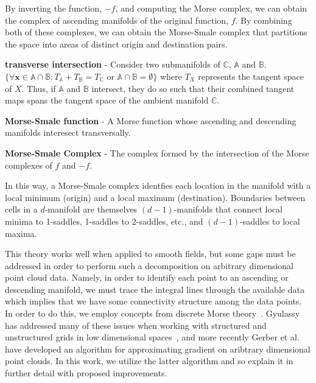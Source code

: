 By inverting the function, $-f$, and computing the Morse complex, we can obtain the complex of ascending manifolds of the original function, $f$.
%
By combining both of these complexes, we can obtain the Morse-Smale complex that partitions the space into areas of distinct origin and destination pairs.


\begin{defn}
\textbf{transverse intersection} - Consider two submanifolds of $\mathbb{C}$, $\mathbb{A}$ and $\mathbb{B}$. $\{\forall \mathbf{x} \in \mathbb{A} \cap \mathbb{B}: T_{\mathbb{A}} + T_{\mathbb{B}} = T_{\mathbb{C}} \text{ or } \mathbb{A} \cap \mathbb{B} = \emptyset\}$ where $T_{X}$ represents the tangent space of $X$.
%
Thus, if $\mathbb{A}$ and $\mathbb{B}$ intersect, they do so such that their combined tangent maps spans the tangent space of the ambient manifold $\mathbb{C}$.
\end{defn}

\begin{defn}
\textbf{Morse-Smale function} - A Morse function whose ascending and descending manifolds interesect transversally.
\end{defn}

\begin{defn}
\textbf{Morse-Smale Complex} - The complex formed by the intersection of the Morse complexes of $f$ and $-f$.
\end{defn}

In this way, a Morse-Smale complex identfies each location in the manifold with a local minimum (origin) and a local maximum (destination).
%
Boundaries between cells in a $d$-manifold are themselves $(d-1)$-manifolds that connect local minima to 1-saddles, 1-saddles to 2-saddles, etc., and $(d-1)$-saddles to local maxima.


This theory works well when applied to smooth fields, but some gaps must be addressed in order to perform such a decomposition on arbitrary dimensional point cloud data.
%
Namely, in order to identify each point to an ascending or descending manifold, we must trace the integral lines through the available data which implies that we have some connectivity structure among the data points.
%
In order to do this, we employ concepts from discrete Morse theory~\cite{Forman2002}.
%
Gyulassy has addressed many of these issues when working with structured and unstructured grids in low dimensional spaces~\cite{Gyulassy2008}, and more recently Gerber et al.~\cite{GerberBremerPascucci2010} have developed an algorithm for approximating gradient on aribtrary dimensional point clouds.
%
In this work, we utilize the latter algorithm and so explain it in further detail with proposed improvements.


